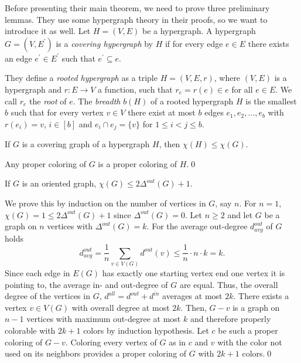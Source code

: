 Before presenting their main theorem, we need to prove three preliminary lemmas. They use some hypergraph theory in their proofs, so we want to introduce it as well. Let $H=(V,E)$ be a hypergraph. A hypergraph $G=(V,E^\prime)$ is a \textit{covering hypergraph} by $H$ if for every edge $e\in E$ there exists an edge $e^\prime\in E^\prime$ such that $e^\prime\subseteq e$. 

They define a \textit{rooted hypergraph} as a triple $H=(V,E,r)$, where $(V,E)$ is a hypergraph and $r:E\to V$ a function, such that $r_e=r(e)\in e$ for all $e\in E$. We call $r_e$ the \textit{root} of $e$. The \textit{breadth} $b(H)$ of a rooted hypergraph $H$ is the smallest $b$ such that for every vertex $v\in V$ there exist at most $b$ edges $e_1,e_2,\dots ,e_b$ with $r(e_i)=v$, $i\in [b]$ and $e_i\cap e_j= \{v\}$ for $1\leq i<j\leq b$.

\begin{lemma}\label{l1cr}
If $G$ is a covering graph of a hypergraph $H$, then $\chi (H)\leq\chi (G)$.
\end{lemma}
\begin{prf}
Any proper coloring of $G$ is a proper coloring of $H$.\qed
\end{prf}

\begin{lemma}\label{l2cr}
If $G$ is an oriented graph, $\chi (G)\leq 2\Delta^{out}(G) +1$.
\end{lemma}
\begin{prf}
We prove this by induction on the number of vertices in $G$, say $n$. For $n=1$, $\chi (G) =1\leq 2\Delta^{out}(G) +1$ since $\Delta^{out}(G)=0$.
Let $n\geq 2$ and let $G$ be a graph on $n$ vertices with $\Delta^{out}(G)=k$. For the average out-degree $d_{avg}^{out}$ of $G$ holds \[d_{avg}^{out}=\dfrac{1}{n}\sum_{v\in V(G)}d^{out}(v)\leq\dfrac{1}{n} \cdot n\cdot k=k.\] Since each edge in $E(G)$ has exactly one starting vertex end one vertex it is pointing to, the average in- and out-degree of $G$ are equal. Thus, the overall degree of the vertices in $G$, $d^{all}=d^{out}+d^{in}$ averages at most $2k$. There exists a vertex $v\in V(G)$ with overall degree at most $2k$. Then, $G-v$ is a graph on $n-1$ vertices with maximum out-degree at most $k$ and therefore properly colorable with $2k+1$ colors by induction hypothesis. Let $c$ be such a proper coloring of $G-v$. Coloring every vertex of $G$ as in $c$ and $v$ with the color not used on its neighbors provides a proper coloring of $G$ with $2k+1$ colors.\qed
\end{prf}


